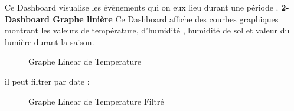 Ce Dashboard visualise les évènements qui on eux lieu durant une période . 
\break
\newline
\textbf{2-  Dashboard Graphe linière}
\newline
Ce Dashboard affiche des courbes graphiques montrant les valeurs de température, d’humidité , humidité de  sol et valeur du lumière durant la saison.
\begin{figure}[hbt]
\centering
\right
\label{fig: Graphe Linear de Temperature}

  \caption{Graphe Linear de Temperature}
\end{figure}

\newpage
il peut filtrer par date :

\begin{figure}[hbt]
\centering
\right
\label{fig: Graphe Linear de Temperature Filtré}

  \caption{Graphe Linear de Temperature Filtré}
\end{figure}

\newpage

